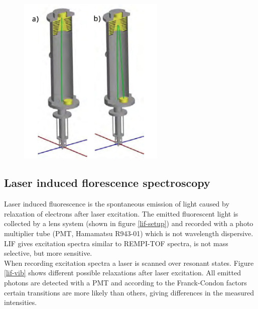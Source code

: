 \documentclass[parskip,12pt,headsepline,a4paper] {scrbook}
\begin{document}
\begin{figure}[ht]
\centerline{
\includegraphics[width=7cm]{./measuring_methods/tof-lin-ref.jpg}}
\end{figure}

\subsection{Laser induced florescence spectroscopy}
\vspace{-1\baselineskip}
Laser induced fluorescence is the spontaneous emission of light caused by relaxation of electrons after laser excitation. The emitted fluorescent light is collected by a lens system (shown in figure \ref{lif-setup}) and recorded with a photo multiplier tube (PMT, Hamamatsu R943-01) which is not wavelength dispersive. LIF gives excitation spectra similar to REMPI-TOF spectra, is not mass selective, but more sensitive. \\
When recording excitation spectra a laser is scanned over resonant states. Figure \ref{lif-vib} shows different possible relaxations after laser excitation. All emitted photons are detected with a PMT and according to the Franck-Condon factors certain transitions are more likely than others, giving differences in the measured intensities.
\end{document}
